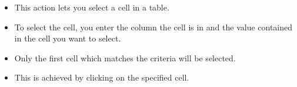
\begin{itemize}
\item This action lets you select a cell in a table.
\item To select the cell, you enter the column the cell is in and the value contained in the cell you want to select.
\item Only the first cell which matches the criteria will be selected.
\item This is achieved by clicking on the specified cell.
\end{itemize}

